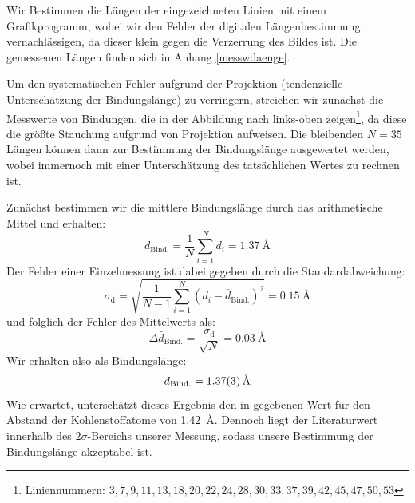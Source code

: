 \documentclass[10pt, a4paper]{article}
\begin{document}
Wir Bestimmen die Längen der eingezeichneten Linien mit einem Grafikprogramm, wobei wir den Fehler der digitalen Längenbestimmung vernachlässigen, da dieser klein gegen die Verzerrung des Bildes ist.
Die gemessenen Längen finden sich in Anhang \ref{messw:laenge}.

Um den systematischen Fehler aufgrund der Projektion (tendenzielle Unterschätzung der Bindungslänge) zu verringern, streichen wir zunächst die Messwerte von Bindungen, die in der Abbildung nach links-oben zeigen\footnote{Liniennummern: $3,7,9,11,13,18,20,22,24,28,30,33,37,39,42,45,47,50,53$}, da diese die größte Stauchung aufgrund von Projektion aufweisen.
Die bleibenden $N = \num{35}$ Längen können dann zur Bestimmung der Bindungslänge ausgewertet werden, wobei immernoch mit einer Unterschätzung des tatsächlichen Wertes zu rechnen ist.

Zunächst bestimmen wir die mittlere Bindungslänge durch das arithmetische Mittel und erhalten:
\begin{equation}
  \bar{d}_\mathrm{Bind.} = \frac{1}{N} \sum_{i=1}^N d_i= \SI{1,37}{\angstrom}
\end{equation}
Der Fehler einer Einzelmessung ist dabei gegeben durch die Standardabweichung:
\begin{equation}
  \sigma_\mathrm{d} = \sqrt{\frac{1}{N-1} \sum_{i=1}^N (d_i - \bar{d}_\mathrm{Bind.})^2} = \SI{0,15}{\angstrom}
\end{equation}
und folglich der Fehler des Mittelwerts als:
\begin{equation}
  \Delta \bar{d}_\mathrm{Bind.} = \frac{\sigma_\mathrm{d}}{\sqrt{N}} = \SI{0,03}{\angstrom}
\end{equation}
Wir erhalten also als Bindungslänge:
\begin{equation}
  d_\mathrm{Bind.} = \SI{1,37 +- 0,03}{\angstrom}
\end{equation}
Wie erwartet, unterschätzt dieses Ergebnis den in \cite{colton} gegebenen Wert für den Abstand der Kohlenstoffatome von \SI{1,42}{\angstrom}. Dennoch liegt der Literaturwert innerhalb des $2\sigma$-Bereichs unserer Messung, sodass unsere Bestimmung der Bindungslänge akzeptabel ist.
\end{document}
